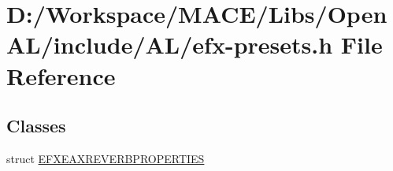 \hypertarget{efx-presets_8h}{}\section{D\+:/\+Workspace/\+M\+A\+C\+E/\+Libs/\+Open\+A\+L/include/\+A\+L/efx-\/presets.h File Reference}
\label{efx-presets_8h}
\subsection*{Classes}
\begin{DoxyCompactItemize}
\item 
struct \hyperlink{struct_e_f_x_e_a_x_r_e_v_e_r_b_p_r_o_p_e_r_t_i_e_s}{E\+F\+X\+E\+A\+X\+R\+E\+V\+E\+R\+B\+P\+R\+O\+P\+E\+R\+T\+I\+ES}
\end{DoxyCompactItemize}
